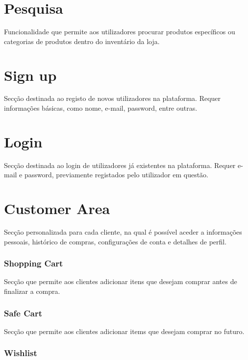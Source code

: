 \section{Pesquisa}
\label{sec.pesquisa}

Funcionalidade que permite aos utilizadores procurar produtos específicos ou categorias de produtos dentro do inventário da loja.

\section{Sign up}
\label{sec.sign}

Secção destinada ao registo de novos utilizadores na plataforma. Requer informações básicas, como nome, e-mail, password, entre outras.

\section{Login}
\label{sec.sign}

Secção destinada ao login de utilizadores já existentes na plataforma. Requer e-mail e password, previamente registados pelo utilizador em questão.

\section{Customer Area}
\label{sec.sign}

Secção personalizada para cada cliente, na qual é possível aceder a informações pessoais, histórico de compras, configurações de conta e detalhes de perfil. 

\subsubsection{Shopping Cart}

Secção que permite aos clientes adicionar itens que desejam comprar antes de finalizar a compra. 

\subsubsection{Safe Cart}

Secção que permite aos clientes adicionar items que desejam comprar no futuro.

\subsubsection{Wishlist}

